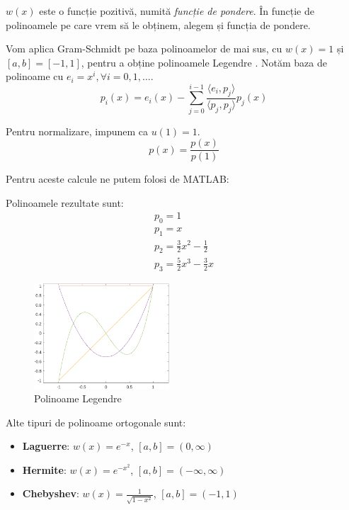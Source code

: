 \documentclass{exam}
\newcommand{\octavescript}[2]{
	
}
\begin{document}
$w(x)$ este o funcție pozitivă, numită \textit{funcție de pondere}. În funcție
de polinoamele pe care vrem să le obținem, alegem și funcția de pondere.

Vom aplica Gram-Schmidt pe baza polinoamelor de mai sus, cu $w(x) = 1$ și
$[a, b] = [-1, 1]$, pentru a obține polinoamele Legendre \cite{orthopol}. Notăm
baza de polinoame cu $e_i = x^i, \forall i = 0, 1, \dots$.
\begin{equation*}
	p_i (x) = e_i (x) - \sum_{j = 0}^{i - 1} \frac{\langle e_i, p_j \rangle}{\langle p_j, p_j \rangle} p_j (x)
\end{equation*}

Pentru normalizare, impunem ca $u (1) = 1$.
\begin{equation*}
	p(x) = \frac{p(x)}{p(1)}
\end{equation*}

\newpage
Pentru aceste calcule ne putem folosi de MATLAB:
\octavescript{./src/polygo.m}{}

Polinoamele rezultate sunt:
\begin{gather*}
	p_0 = 1 \\
	p_1 = x \\
	p_2 = \frac{3}{2} x^2 - \frac{1}{2} \\
	p_3 = \frac{5}{2} x^3 - \frac{3}{2} x
\end{gather*}
\begin{figure}[ht]
	\centering
	\includegraphics[width=0.45\textwidth]{legendre}
	\caption{Polinoame Legendre}
	\label{fig:6}
\end{figure}

Alte tipuri de polinoame ortogonale sunt:
\begin{itemize}
	\item \textbf{Laguerre}: $w(x) = e^{-x}$, $[a, b] = (0, \infty)$
	\item \textbf{Hermite}: $w(x) = e^{-x^2}$, $[a, b] = (-\infty, \infty)$
	\item \textbf{Chebyshev}: $w(x) = \frac{1}{\sqrt{1 - x^2}}$, $[a, b] = (-1, 1)$
\end{itemize}
\end{document}
